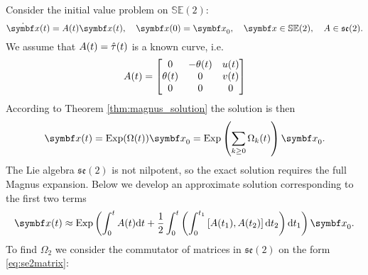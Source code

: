 Consider the initial value problem on $\mathbb{SE}(2)$:
\begin{equation}
  \dot \x(t) = \lx(t) \x(t), \quad \x(0) = \x_0, \quad \x \in \mathbb{SE}(2), \quad \lx \in \mathfrak{se}(2).
\end{equation}
We assume that $A(t) = \hat {\tau}(t)$ is a known curve, i.e.
\begin{equation}
  \label{eq:se2matrix}
  A(t) = \begin{bmatrix}
    0 & -\theta(t) & u(t) \\ \theta(t) & 0 & v(t) \\ 0 & 0 & 0
  \end{bmatrix}
\end{equation}
According to Theorem \ref{thm:magnus_solution} the solution is then
\begin{equation}
  \x(t) = \Exp(\Omega(t)) \x_0 = \Exp \left( \sum_{k \geq 0} \Omega_k(t) \right) \x_0.
\end{equation}
The Lie algebra $\mathfrak{se}(2)$ is not nilpotent, so the exact solution requires the full Magnus expansion. Below we develop an approximate solution corresponding to the first two terms
\begin{equation}
  \x(t) \approx \Exp \left( \int_0^t A(t) \mathrm{d} t + \frac{1}{2} \int_{0}^t \left(\int_{0}^{t_1} \left[ A(t_1), A(t_2) \right] \mathrm{d} t_2 \right) \mathrm{d} t_1 \right) \x_0.
\end{equation}
To find $\Omega_2$ we consider the commutator of matrices in $\mathfrak{se}(2)$ on the form \eqref{eq:se2matrix}:
